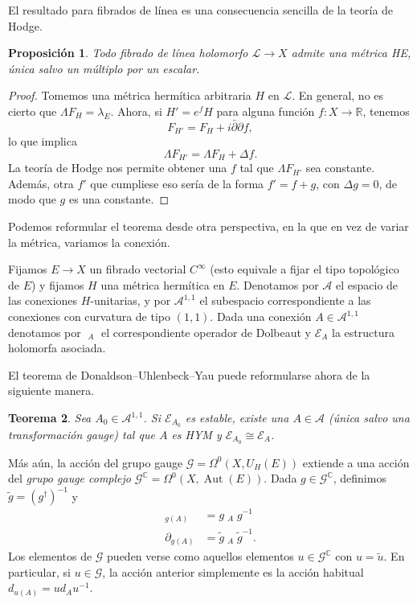 \documentclass[12pt, a4paper]{amsart}
\newcommand\CC{\mathbb{C}}
\newcommand\RR{\mathbb{R}}
\newcommand\Aa{\mathcal{A}}
\newcommand\GG{\mathcal{G}}
\newcommand\EE{\mathscr{E}}
\newcommand\LL{\mathscr{L}}
\DeclareMathOperator\Aut{Aut}
\DeclareMathOperator\delbar{\bar{\partial}}
\newtheorem{thm}{Teorema}[section]
\newtheorem{prop}[thm]{Proposición}
\theoremstyle{remark} \newtheorem{rmk}[thm]{Observación}
\theoremstyle{remark} \newtheorem{rmks}[thm]{Observaciones}
\theoremstyle{definition} \newtheorem{defn}[thm]{Definición}
\theoremstyle{definition} \newtheorem{ejs}[thm]{Ejemplos}
\theoremstyle{definition} \newtheorem{ej}[thm]{Ejemplo}
\begin{document}
El resultado para fibrados de línea es una consecuencia sencilla de la teoría de Hodge.
\begin{prop}
	Todo fibrado de línea holomorfo $\LL \rightarrow X$ admite una métrica HE, única salvo un múltiplo por un escalar.
\end{prop}

\begin{proof}
	Tomemos una métrica hermítica arbitraria $H$ en $\LL$. En general, no es cierto que $\Lambda F_H = \lambda_E$. Ahora, si  $H'=e^f H$ para alguna función $f:X\rightarrow \RR$, tenemos
	\begin{equation*}
	F_{H'} = F_H + i \bar{\partial} \partial f,
	\end{equation*} 
	lo que implica
	\begin{equation*}
	\Lambda F_{H'} = \Lambda F_H + \Delta f.
	\end{equation*} 
	La teoría de Hodge nos permite obtener una $f$ tal que  $\Lambda F_{H'}$ sea constante. Además, otra $f'$ que cumpliese eso sería de la forma  $f'=f+g$, con  $\Delta g=0$, de modo que  $g$ es una constante.
\end{proof}

Podemos reformular el teorema desde otra perspectiva, en la que en vez de variar la métrica, variamos la conexión.

Fijamos $E\rightarrow X$ un fibrado vectorial  $C^\infty$  (esto equivale a fijar el tipo topológico de $E$) y fijamos $H$ una métrica hermítica en $E$. Denotamos por $\Aa$ el espacio de las conexiones $H$-unitarias, y por $\Aa^{1,1}$ el subespacio correspondiente a las conexiones con curvatura de tipo $(1,1)$. Dada una conexión $A\in \Aa^{1,1}$ denotamos por $\delbar_A$ el correspondiente operador de Dolbeaut y $\EE_A$ la estructura holomorfa asociada.

El teorema de Donaldson--Uhlenbeck--Yau puede reformularse ahora de la siguiente manera.

\begin{thm}
	Sea $A_0 \in \Aa^{1,1}$. Si $\EE_{A_0}$ es estable, existe una $A\in \Aa$ (única salvo una transformación gauge) tal que $A$ es HYM y $\EE_{A_0}\cong \EE_A$.
\end{thm}

Más aún, la acción del grupo gauge $\GG=\Omega^0(X,U_H(E))$ extiende a una acción del \emph{grupo gauge complejo} $\GG^{\CC}=\Omega^0(X,\Aut(E))$. Dada $g\in \GG^\CC$, definimos  $\tilde{g}=(g^\dagger)^{-1}$ y
\begin{align*}
	\delbar_{g(A)}&= g \delbar_A g^{-1} \\
	\partial_{g(A)}&= \tilde{g} \delbar_A \tilde{g}^{-1}.
\end{align*} 
Los elementos de $\GG$ pueden verse como aquellos elementos $u\in \GG^\CC$ con $u=\tilde{u}$. En particular, si $u\in \GG$, la acción anterior simplemente es la acción habitual $d_{u(A)}=ud_A u^{-1}$.
\end{document}
